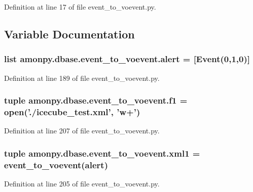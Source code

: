 Definition at line 17 of file event\-\_\-to\-\_\-voevent.\-py.



\subsection{Variable Documentation}
\hypertarget{namespaceamonpy_1_1dbase_1_1event__to__voevent_af18d1f254a71c0b995ce6157afc2e83f}{
\subsubsection[{alert}]{\setlength{\rightskip}{0pt plus 5cm}list amonpy.\-dbase.\-event\-\_\-to\-\_\-voevent.\-alert = \mbox{[}Event(0,1,0)\mbox{]}}}\label{namespaceamonpy_1_1dbase_1_1event__to__voevent_af18d1f254a71c0b995ce6157afc2e83f}


Definition at line 189 of file event\-\_\-to\-\_\-voevent.\-py.

\hypertarget{namespaceamonpy_1_1dbase_1_1event__to__voevent_a53fa982747642d3a0a3ea13ba8547b10}{
\subsubsection[{f1}]{\setlength{\rightskip}{0pt plus 5cm}tuple amonpy.\-dbase.\-event\-\_\-to\-\_\-voevent.\-f1 = open('./icecube\-\_\-test.\-xml', 'w+')}}\label{namespaceamonpy_1_1dbase_1_1event__to__voevent_a53fa982747642d3a0a3ea13ba8547b10}


Definition at line 207 of file event\-\_\-to\-\_\-voevent.\-py.

\hypertarget{namespaceamonpy_1_1dbase_1_1event__to__voevent_ac83aa72b938b72eeadd9492ef63e72e2}{
\subsubsection[{xml1}]{\setlength{\rightskip}{0pt plus 5cm}tuple amonpy.\-dbase.\-event\-\_\-to\-\_\-voevent.\-xml1 = {\bf event\-\_\-to\-\_\-voevent}({\bf alert})}}\label{namespaceamonpy_1_1dbase_1_1event__to__voevent_ac83aa72b938b72eeadd9492ef63e72e2}


Definition at line 205 of file event\-\_\-to\-\_\-voevent.\-py.

